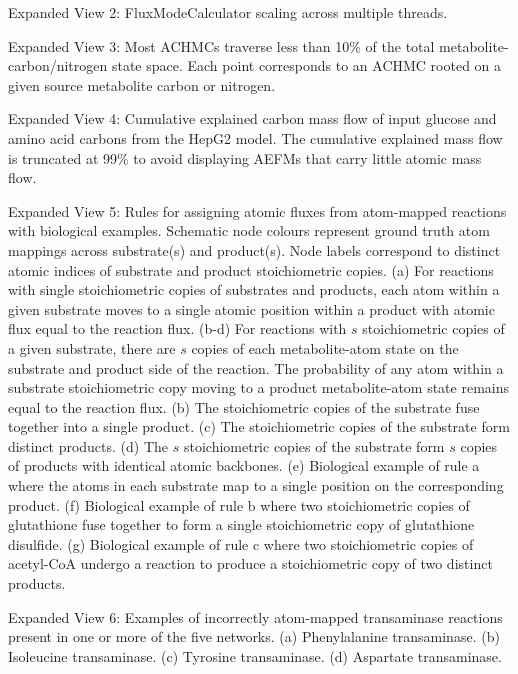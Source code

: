 \documentclass[12pt]{article}
\begin{document}
\noindent Expanded View 2: FluxModeCalculator scaling across multiple
threads.

\noindent Expanded View 3: Most ACHMCs traverse less than 10\% of the
total metabolite-carbon/nitrogen state space. Each point corresponds to an
ACHMC rooted on a given source metabolite carbon or nitrogen.

\noindent Expanded View 4: Cumulative explained carbon mass flow of input
glucose and amino acid carbons from the HepG2 model. The cumulative
explained mass flow is truncated at 99\% to avoid displaying AEFMs that
carry little atomic mass flow.

\noindent Expanded View 5: Rules for assigning atomic fluxes from
atom-mapped reactions with biological examples. Schematic node colours
represent ground truth atom mappings across substrate(s) and product(s).
Node labels correspond to distinct atomic indices of substrate and product
stoichiometric copies.
(a) For reactions with single stoichiometric copies of substrates and
products, each atom within a given substrate moves to a single atomic
position within a product with atomic flux equal to the reaction flux.
(b-d) For reactions with $s$ stoichiometric copies of a given substrate,
there are $s$ copies of each metabolite-atom state on the substrate and
product side of the reaction. The probability of any atom within
a substrate stoichiometric copy moving to a product metabolite-atom state
remains equal to the reaction flux. (b) The stoichiometric copies of the
substrate fuse together into a single product. (c) The stoichiometric
copies of the substrate form distinct products. (d) The $s$ stoichiometric
copies of the substrate form $s$ copies of products with identical atomic
backbones. (e) Biological example of rule a where the atoms in each
substrate map to a single position on the corresponding product. (f)
Biological example of rule b where two stoichiometric copies of
glutathione fuse together to form a single stoichiometric copy of
glutathione disulfide. (g) Biological example of rule c where two
stoichiometric copies of acetyl-CoA undergo a reaction to produce
a stoichiometric copy of two distinct products.

\noindent Expanded View 6: Examples of incorrectly atom-mapped transaminase
reactions present in one or more of the five networks. (a) Phenylalanine
transaminase. (b) Isoleucine transaminase. (c) Tyrosine transaminase. (d)
Aspartate transaminase.
\end{document}
